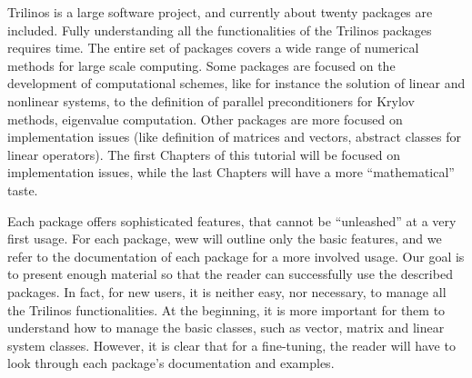 \smallskip

Trilinos is a large software project, and currently about twenty
packages are included. Fully understanding all the functionalities of
the Trilinos packages requires time. The entire set of packages covers a
wide range of numerical methods for large scale computing. Some packages
are focused on the development of computational schemes, like for
instance the solution of linear and nonlinear systems, to the definition
of parallel preconditioners for Krylov methods, eigenvalue computation.
Other packages are more focused on implementation issues (like
definition of matrices and vectors, abstract classes for linear
operators). The first Chapters of this tutorial will be focused on
implementation issues, while the last Chapters will have a more
``mathematical'' taste.

Each package offers sophisticated features, that cannot be ``unleashed''
at a very first usage. For each package, wew will outline only the basic
features, and we refer to the documentation of each package for a more
involved usage. Our goal is to present enough material so that the
reader can successfully use the described packages.  In fact, for new
users, it is neither easy, nor necessary, to manage all the Trilinos
functionalities. At the beginning, it is more important for them to
understand how to manage the basic classes, such as vector, matrix and
linear system classes. However, it is clear that for a fine-tuning, the
reader will have to look through each package's documentation and
examples.

\medskip

